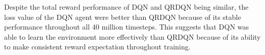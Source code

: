 Despite the total reward performance of DQN and QRDQN being similar, the loss value of the DQN agent were better than QRDQN because of its stable performance throughout all 40 million timesteps. This suggests that DQN was able to learn the environment more effectively than QRDQN because of its ability to make consistent reward expectation throughout training.
